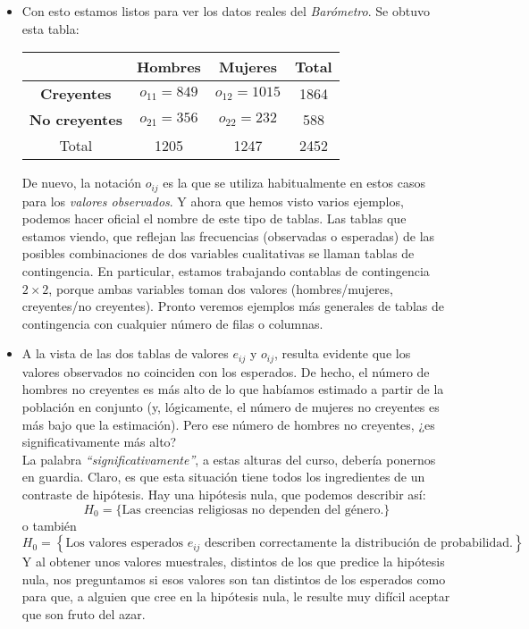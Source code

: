 \begin{itemize}
    \item Con esto estamos listos para ver los datos reales del {\em Barómetro}. Se obtuvo esta tabla:
        \begin{center}
        \begin{tabular}{|c|c|c|c|}
          \hline
           &{\bf Hombres }&{\bf Mujeres }& Total \\
           \hline
          {\bf Creyentes }& $o_{11}=849$ & $o_{12}=1015$ & 1864 \\
          \hline
          {\bf No creyentes }& $o_{21}=356$ & $o_{22}=232$ & 588 \\
          \hline
          Total & 1205 & 1247 & 2452 \\
          \hline
        \end{tabular}
        \end{center}
        De nuevo, la notación $o_{ij}$ es la que se utiliza habitualmente en estos casos para los {\em valores observados}. Y ahora que hemos visto varios ejemplos, podemos hacer oficial el nombre de este tipo de tablas. Las tablas que estamos viendo, que reflejan las frecuencias (observadas o esperadas) de las posibles combinaciones de dos variables cualitativas se llaman {\sf tablas de contingencia}. En particular, estamos trabajando contablas de contingencia $2\times 2$, porque ambas variables toman dos valores (hombres/mujeres, creyentes/no creyentes). Pronto veremos ejemplos más generales de tablas de contingencia con cualquier número de filas o columnas.

    \item   A la vista de las dos tablas de valores $e_{ij}$ y $o_{ij}$, resulta evidente que los valores observados no coinciden con los esperados. De hecho, el número de hombres no creyentes es más alto de lo que habíamos estimado a partir de la población en conjunto (y, lógicamente, el número de mujeres no creyentes es más bajo que la estimación). Pero ese número de hombres no creyentes, ¿es {\sf significativamente} más alto?\\
    La palabra {\em ``significativamente''}, a estas alturas del curso, debería ponernos en guardia. Claro, es que esta situación tiene todos los ingredientes de un contraste de hipótesis. Hay una hipótesis nula, que podemos describir así:
        \[H_0=\{\mbox{Las creencias religiosas no dependen del género.} \}\]
        o también
        \[H_0=\left\{\mbox{Los valores esperados $e_{ij}$ describen correctamente la distribución de probabilidad.}\right\}\]
        Y al obtener unos valores muestrales, distintos de los que predice la hipótesis nula, nos preguntamos si esos valores son tan distintos de los esperados como para que, a alguien que cree en la hipótesis nula, le resulte muy difícil aceptar que son fruto del azar.\\


\end{itemize}
